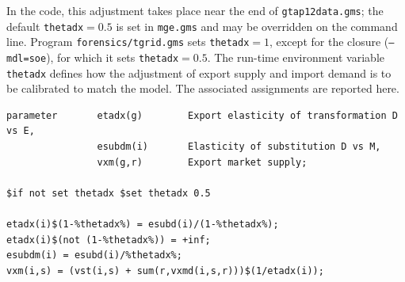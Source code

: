 In the \GAMS code, this adjustment takes place near the end of \texttt{gtap12data.gms}; the default \texttt{thetadx}$=0.5$ is set in \texttt{mge.gms} and may be overridden on the command line.
Program \texttt{forensics/tgrid.gms} sets \texttt{thetadx}$=1$, except for the \SOE closure (\texttt{--mdl=soe}), for which it sets \texttt{thetadx}$=0.5$.
The run-time environment variable \texttt{thetadx} defines how the adjustment of export supply and import demand is to be calibrated to match the \GMR model.
The associated assignments are reported here.

\begin{Verbatim}
parameter       etadx(g)        Export elasticity of transformation D vs E,
                esubdm(i)       Elasticity of substitution D vs M,
                vxm(g,r)        Export market supply;

$if not set thetadx $set thetadx 0.5

etadx(i)$(1-%thetadx%) = esubd(i)/(1-%thetadx%);
etadx(i)$(not (1-%thetadx%)) = +inf;
esubdm(i) = esubd(i)/%thetadx%;
vxm(i,s) = (vst(i,s) + sum(r,vxmd(i,s,r)))$(1/etadx(i));
\end{Verbatim}

